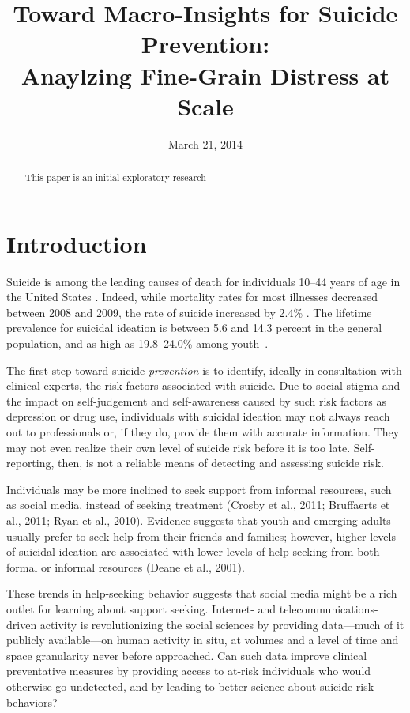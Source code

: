 \documentclass[11pt]{article}
\title{Toward Macro-Insights  for Suicide Prevention: \\ Anaylzing Fine-Grain Distress at Scale}
\date{March 21, 2014}
\begin{document}
\maketitle
\begin{abstract}

This paper is an initial exploratory research 
 \end{abstract}

\section{Introduction}


Suicide is among the leading causes of death for individuals 10--44 years of age in the United States \cite{heron2009deaths}. Indeed, while mortality rates for most illnesses decreased between 2008 and 2009, the rate of suicide increased by 2.4\%  \cite{heron2009deaths}. The lifetime prevalence for suicidal ideation is between 5.6 and 14.3 percent in the general population, and as high as 19.8--24.0\% among youth~\cite{nock2008suicide}. 

The first step toward suicide \emph{prevention} is to identify, ideally in consultation with clinical experts, the risk factors associated with suicide.  Due to social stigma and the impact on self-judgement and self-awareness caused by such risk factors as depression or drug use, individuals with suicidal ideation may not always reach out to professionals or, if they do, provide them with accurate information. They may not even realize their own level of suicide risk before it is too late. Self-reporting, then, is not a reliable means of detecting and assessing suicide risk.

 Individuals may be more inclined to seek support from informal resources, such as social media, instead of seeking treatment (Crosby et al., 2011; Bruffaerts et al., 2011; Ryan et al., 2010). Evidence suggests that youth and emerging adults usually prefer to seek help from their friends and families; however, higher levels of suicidal ideation are associated with lower levels of help-seeking from both formal or informal resources (Deane et al., 2001).  

These trends in help-seeking behavior suggests that social media might be a rich outlet for learning about support seeking.
Internet- and telecommunications-driven activity is revolutionizing the social sciences by providing data---much of it publicly available---on human activity in situ, at volumes and a level of time and space granularity never before approached. Can such data improve clinical preventative measures by providing access to at-risk individuals who would otherwise go undetected, and by leading to better science about suicide risk behaviors? 
\end{document}
